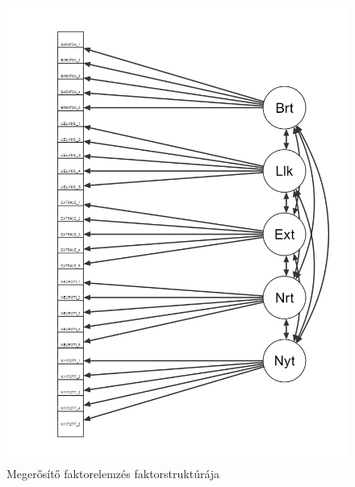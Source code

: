 \documentclass[
  letterpaper,
]{krantz}
\begin{document}
\begin{figure}

{\centering \includegraphics{./images/faktor_bfi_sample2_cfa_modell.png}

}

\caption{Megerősítő faktorelemzés faktorstruktúrája}

\end{figure}
\end{document}
